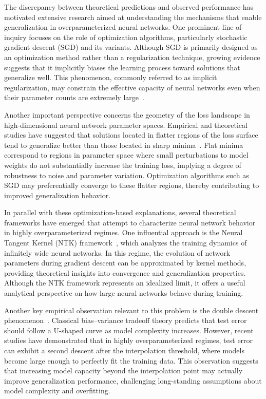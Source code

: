 \documentclass[conference]{IEEEtran}
\begin{document}
The discrepancy between theoretical predictions and observed performance has motivated extensive research aimed at understanding the mechanisms that enable generalization in overparameterized neural networks. One prominent line of inquiry focuses on the role of optimization algorithms, particularly stochastic gradient descent (SGD) and its variants. Although SGD is primarily designed as an optimization method rather than a regularization technique, growing evidence suggests that it implicitly biases the learning process toward solutions that generalize well. This phenomenon, commonly referred to as implicit regularization, may constrain the effective capacity of neural networks even when their parameter counts are extremely large~\cite{neyshabur2017exploring}.

Another important perspective concerns the geometry of the loss landscape in high-dimensional neural network parameter spaces. Empirical and theoretical studies have suggested that solutions located in flatter regions of the loss surface tend to generalize better than those located in sharp minima~\cite{hochreiter1997flat,keskar2017large}. Flat minima correspond to regions in parameter space where small perturbations to model weights do not substantially increase the training loss, implying a degree of robustness to noise and parameter variation. Optimization algorithms such as SGD may preferentially converge to these flatter regions, thereby contributing to improved generalization behavior.

In parallel with these optimization-based explanations, several theoretical frameworks have emerged that attempt to characterize neural network behavior in highly overparameterized regimes. One influential approach is the Neural Tangent Kernel (NTK) framework~\cite{jacot2018neural}, which analyzes the training dynamics of infinitely wide neural networks. In this regime, the evolution of network parameters during gradient descent can be approximated by kernel methods, providing theoretical insights into convergence and generalization properties. Although the NTK framework represents an idealized limit, it offers a useful analytical perspective on how large neural networks behave during training.

Another key empirical observation relevant to this problem is the double descent phenomenon~\cite{belkin2019reconciling,nakkiran2020deep}. Classical bias--variance tradeoff theory predicts that test error should follow a U-shaped curve as model complexity increases. However, recent studies have demonstrated that in highly overparameterized regimes, test error can exhibit a second descent after the interpolation threshold, where models become large enough to perfectly fit the training data. This observation suggests that increasing model capacity beyond the interpolation point may actually improve generalization performance, challenging long-standing assumptions about model complexity and overfitting.
\end{document}
